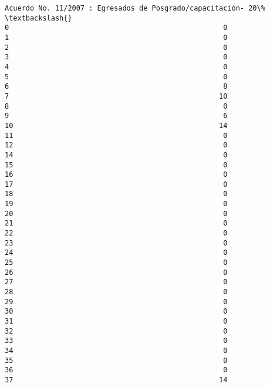 \documentclass[11pt]{article}
\begin{document}
\begin{Verbatim}[commandchars=\\\{\}]
    Acuerdo No. 11/2007 : Egresados de Posgrado/capacitación- 20\%  \textbackslash{}
0                                                   0               
1                                                   0               
2                                                   0               
3                                                   0               
4                                                   0               
5                                                   0               
6                                                   8               
7                                                  10               
8                                                   0               
9                                                   6               
10                                                 14               
11                                                  0               
12                                                  0               
14                                                  0               
15                                                  0               
16                                                  0               
17                                                  0               
18                                                  0               
19                                                  0               
20                                                  0               
21                                                  0               
22                                                  0               
23                                                  0               
24                                                  0               
25                                                  0               
26                                                  0               
27                                                  0               
28                                                  0               
29                                                  0               
30                                                  0               
31                                                  0               
32                                                  0               
33                                                  0               
34                                                  0               
35                                                  0               
36                                                  0               
37                                                 14               

\end{Verbatim}
\end{document}
